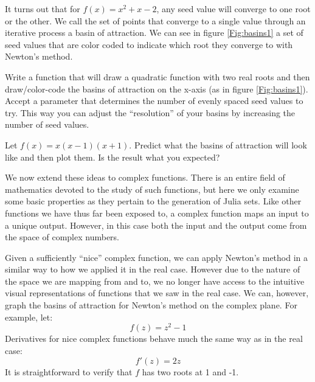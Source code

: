 It turns out that for $f(x) = x^2 + x - 2$, any seed value will converge to one root or the other.  We call the set of points that converge to a single value through an iterative process a basin of attraction.  We can see in figure \ref{Fig:basins1} a set of seed values that are color coded to indicate which root they converge to with Newton's method.

\begin{problem}
Write a function that will draw a quadratic function with two real roots and then draw/color-code the basins of attraction on the x-axis (as in figure \ref{Fig:basins1}).  Accept a parameter that determines the number of evenly spaced seed values to try.  This way you can adjust the ``resolution'' of your basins by increasing the number of seed values.
\end{problem}
\begin{problem}
Let $f(x) = x(x-1)(x+1)$.  Predict what the basins of attraction will look like and then plot them.  Is the result what you expected?
\end{problem}


We now extend these ideas to complex functions.  There is an entire field of mathematics devoted to the study of such functions, but here we only examine some basic properties as they pertain to the generation of Julia sets.  Like other functions we have thus far been exposed to, a complex function maps an input to a unique output.  However, in this case both the input and the output come from the space of complex numbers.%

Given a sufficiently ``nice'' complex function, we can apply Newton's method in a similar way to how we applied it in the real case.  However due to the nature of the space we are mapping from and to, we no longer have access to the intuitive visual representations of functions that we saw in the real case.  We can, however, graph the basins of attraction for Newton's method on the complex plane.  For example, let:
\[
f(z) = z^2 - 1
\]
Derivatives for nice complex functions behave much the same way as in the real case:
\[
f'(z) = 2z
\]
It is straightforward to verify that $f$ has two roots at 1 and -1.

